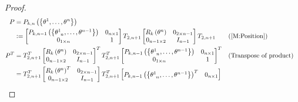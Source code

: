 \documentclass[stu, babel, american, biblatex, a4paper, leqno, draftall]{apa7}
\begin{document}
\begin{proof}
    \begin{align*}
        P&=P_{k,n}\left(\left\{\tensor{\theta}{^1},\dots,\tensor{\theta}{^n}\right\}\right) \\
        &\defeq
        \begin{bmatrix}
            P_{k,n-1}\left(\left\{\tensor{\theta}{^1_{n}},\dots,\tensor{\theta}{^{n-1}}\right\}\right) & 0_{n\times 1} \\
            0_{1\times n}                                                                              & 1             \\
        \end{bmatrix}
        T_{2,n+1}
        \begin{bmatrix}
            R_k\left(\tensor{\theta}{^n}\right) & 0_{{2}\times{n-1}} \\
            0_{{n-1}\times{2}}                  & {I}_{n-1}          \\
        \end{bmatrix}
        T_{2,n+1} && \text{(\cref{M:Position})} \\
        P^T
        &=
        T_{2,n+1}^T
        \begin{bmatrix}
            R_k\left(\tensor{\theta}{^n}\right) & 0_{{2}\times{n-1}} \\
            0_{{n-1}\times{2}}                  & {I}_{n-1}          \\
        \end{bmatrix}^T
        T_{2,n+1}^T
        \begin{bmatrix}
            P_{k,n-1}\left(\left\{\tensor{\theta}{^1_{n}},\dots,\tensor{\theta}{^{n-1}}\right\}\right) & 0_{n\times 1} \\
            0_{1\times n}                                                                              & 1             \\
        \end{bmatrix}^T && \text{(Transpose of product)} \\
        &=
        T_{2,n+1}^T
        \begin{bmatrix}
            R_k\left(\tensor{\theta}{^n}\right)^T & 0_{{2}\times{n-1}} \\
            0_{{n-1}\times{2}}                  & {I}_{n-1}          \\
        \end{bmatrix}
        T_{2,n+1}^T
        \begin{bmatrix}
            P_{k,n-1}\left(\left\{\tensor{\theta}{^1_{n}},\dots,\tensor{\theta}{^{n-1}}\right\}\right)^T & 0_{n\times 1} \\

\end{bmatrix}
\end{align*}
\end{proof}
\end{document}
